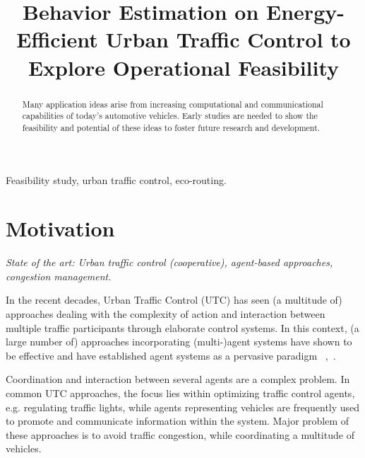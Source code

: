 \documentclass[conference]{../cls/IEEEtran}
\begin{document}
\title{Behavior Estimation on Energy-Efficient Urban Traffic Control to Explore
Operational Feasibility}

\author{
	\and
}

\maketitle

\begin{abstract}
Many application ideas arise from increasing computational and communicational capabilities of today's automotive vehicles.
Early studies are needed to show the feasibility and potential of these ideas to foster future research and development.
\end{abstract}

\begin{IEEEkeywords}
Feasibility study, urban traffic control, eco-routing.
\end{IEEEkeywords}

\section{Motivation}

\textit{State of the art: Urban traffic control (cooperative), agent-based
approaches, congestion management.}

In the recent decades, Urban Traffic Control (UTC) has seen (a multitude of)
approaches dealing with the complexity of action and interaction between
multiple traffic participants through elaborate control systems. 
In this context, (a large number of) approaches incorporating
(multi-)agent systems have shown to be effective and have established
agent systems as a pervasive paradigm ~\cite{Chen2010},~\cite{Roozemond1999}.

Coordination and interaction between several agents are a complex problem.
In common UTC approaches, the focus lies within optimizing traffic control
agents, e.g.
regulating traffic lights, while agents representing vehicles are frequently used to promote and communicate information
within the system. Major problem of these approaches is to avoid traffic
congestion, while coordinating a multitude of vehicles.
\end{document}
